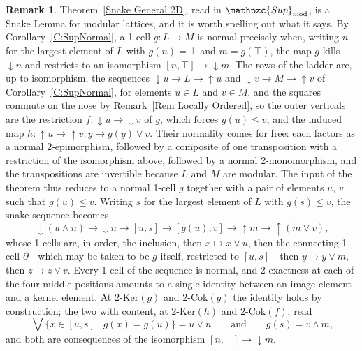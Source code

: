 \documentclass[reqno,a4paper]{amsart}
\numberwithin{equation}{section}
\theoremstyle{plain}
\theoremstyle{definition}
\newtheorem{remark}[subsection]{Remark}
\def\nameit#1{\textrm{#1}~}
\def\thex{\nameit{Theorem}}
\def\corx{\nameit{Corollary}}
\def\remx{\nameit{Remark}}
\newcommand{\Supmod}{\ensuremath{\mathpzc{Sup}_{\mathrm{mod}}}}
\renewcommand{\1}{\onecat{1}}
\newcommand{\dseg}[1]{\ensuremath{{\downarrow}#1}}
\newcommand{\useg}[1]{\ensuremath{{\uparrow}#1}}
\newcommand{\TwoKer}{\ensuremath{2\text{-}\mathrm{Ker}}}
\newcommand{\TwoCoker}{\ensuremath{2\text{-}\mathrm{Cok}}}
\newcommand{\too}{\longrightarrow}
\begin{document}
\begin{remark}\label{Rem Lattice Snake}
	\thex\ref{Snake General 2D}, read in \(\Supmod\), is a Snake Lemma for modular lattices, and it is worth spelling out what it says. By \corx\ref{C:SupNormal}, a 1-cell \(g\colon L\to M\) is normal precisely when, writing \(n\) for the largest element of \(L\) with \(g(n)=\bot\) and \(m=g(\top)\), the map \(g\) kills \(\dseg{n}\) and restricts to an isomorphism \([n,\top]\to\dseg{m}\). The rows of the ladder are, up to isomorphism, the sequences \(\dseg{u}\to L\to\useg{u}\) and \(\dseg{v}\to M\to\useg{v}\) of \corx\ref{C:SupNormal}, for elements \(u\in L\) and \(v\in M\), and the squares commute on the nose by \remx\ref{Rem Locally Ordered}, so the outer verticals are the restriction \(f\colon\dseg{u}\to\dseg{v}\) of \(g\), which forces \(g(u)\leq v\), and the induced map \(h\colon\useg{u}\to\useg{v}\colon y\mapsto g(y)\vee v\). Their normality comes for free: each factors as a normal 2-epimorphism, followed by a composite of one transposition with a restriction of the isomorphism above, followed by a normal 2-monomorphism, and the transpositions are invertible because \(L\) and \(M\) are modular. The input of the theorem thus reduces to a normal 1-cell \(g\) together with a pair of elements \(u\), \(v\) such that \(g(u)\leq v\). Writing \(s\) for the largest element of \(L\) with \(g(s)\leq v\), the snake sequence becomes
	\[
		\dseg{(u\wedge n)}\too\dseg{n}\too[u,s]\too[g(u),v]\too\useg{m}\too\useg{(m\vee v)}\text{,}
	\]
	whose 1-cells are, in order, the inclusion, then \(x\mapsto x\vee u\), then the connecting 1-cell \(\partial\)---which may be taken to be \(g\) itself, restricted to \([u,s]\)---then \(y\mapsto y\vee m\), then \(z\mapsto z\vee v\). Every 1-cell of the sequence is normal, and 2-exactness at each of the four middle positions amounts to a single identity between an image element and a kernel element. At \(\TwoKer(g)\) and \(\TwoCoker(g)\) the identity holds by construction; the two with content, at \(\TwoKer(h)\) and \(\TwoCoker(f)\), read
	\[
		\bigvee\{x\in[u,s]\mid g(x)=g(u)\}=u\vee n\qquad\text{and}\qquad g(s)=v\wedge m\text{,}
	\]
	and both are consequences of the isomorphism \([n,\top]\to\dseg{m}\).
\end{remark}
\end{document}
